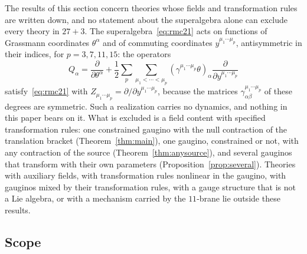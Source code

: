 \begin{remark}
\label{rem:noblanket}
The results of this section concern theories whose fields and transformation rules are written down, and no statement about the superalgebra alone can exclude every theory in $27+3$. The superalgebra~\eqref{eq:rmc21} acts on functions of Grassmann coordinates $\theta^\alpha$ and of commuting coordinates $y^{\mu_1\cdots\mu_p}$, antisymmetric in their indices, for $p=3,7,11,15$: the operators
\[
Q_\alpha=\frac{\partial}{\partial\theta^\alpha}+\frac12\sum_p\sum_{\mu_1<\cdots<\mu_p}(\gamma^{\mu_1\cdots\mu_p}\theta)_\alpha\frac{\partial}{\partial y^{\mu_1\cdots\mu_p}}
\]
satisfy~\eqref{eq:rmc21} with $Z_{\mu_1\cdots\mu_p}=\partial/\partial y^{\mu_1\cdots\mu_p}$, because the matrices $\gamma^{\mu_1\cdots\mu_p}_{\alpha\beta}$ of these degrees are symmetric. Such a realization carries no dynamics, and nothing in this paper bears on it. What is excluded is a field content with specified transformation rules: one constrained gaugino with the null contraction of the translation bracket (Theorem~\ref{thm:main}), one gaugino, constrained or not, with any contraction of the source (Theorem~\ref{thm:anysource}), and several gauginos that transform with their own parameters (Proposition~\ref{prop:several}). Theories with auxiliary fields, with transformation rules nonlinear in the gaugino, with gauginos mixed by their transformation rules, with a gauge structure that is not a Lie algebra, or with a mechanism carried by the $11$-brane lie outside these results.
\end{remark}

\subsection{Scope}
\label{ssec:scope}

